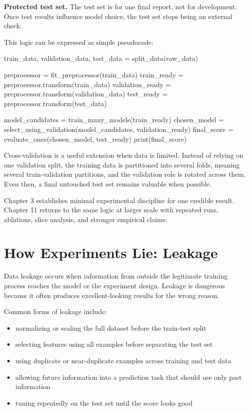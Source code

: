 \begin{thinkingtool}
\textbf{Protected test set.} The test set is for one final report, not for development. Once test results influence model choice, the test set stops being an external check.
\end{thinkingtool}

This logic can be expressed as simple pseudocode:

\begin{codeexample}[caption={A disciplined evaluation workflow}]
train_data, validation_data, test_data = split_data(raw_data)

preprocessor = fit_preprocessor(train_data)
train_ready = preprocessor.transform(train_data)
validation_ready = preprocessor.transform(validation_data)
test_ready = preprocessor.transform(test_data)

model_candidates = train_many_models(train_ready)
chosen_model = select_using_validation(model_candidates, validation_ready)
final_score = evaluate_once(chosen_model, test_ready)
print(final_score)
\end{codeexample}

Cross-validation is a useful extension when data is limited. Instead of relying on one validation split, the training data is partitioned into several folds, meaning several train-validation partitions, and the validation role is rotated across them. Even then, a final untouched test set remains valuable when possible.

\begin{practicalnote}
Chapter 3 establishes minimal experimental discipline for one credible result. Chapter 11 returns to the same logic at larger scale with repeated runs, ablations, slice analysis, and stronger empirical claims.
\end{practicalnote}

\section{How Experiments Lie: Leakage}

Data leakage occurs when information from outside the legitimate training process reaches the model or the experiment design. Leakage is dangerous because it often produces excellent-looking results for the wrong reason.

Common forms of leakage include:
\begin{itemize}[leftmargin=*]
\item normalizing or scaling the full dataset before the train-test split
\item selecting features using all examples before separating the test set
\item using duplicate or near-duplicate examples across training and test data
\item allowing future information into a prediction task that should use only past information
\item tuning repeatedly on the test set until the score looks good
\end{itemize}

